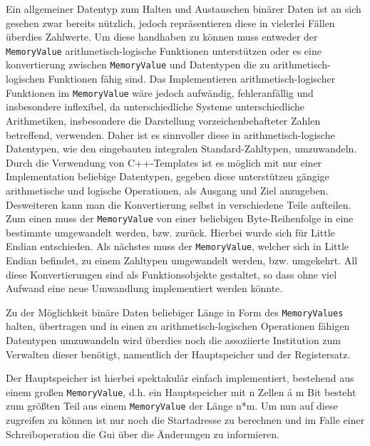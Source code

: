 Ein allgemeiner Datentyp zum Halten und Austauschen binärer Daten ist an sich
gesehen zwar bereits nützlich, jedoch repräsentieren diese in vielerlei Fällen
überdies Zahlwerte. Um diese handhaben zu können muss entweder der
\texttt{MemoryValue} arithmetisch-logische Funktionen unterstützen oder es eine
konvertierung zwischen \texttt{MemoryValue} und Datentypen die zu
arithmetisch-logischen Funktionen fähig sind. Das Implementieren
arithmetisch-logischer Funktionen im \texttt{MemoryValue} wäre jedoch
aufwändig, fehleranfällig und insbesondere inflexibel, da unterschiedliche
Systeme unterschiedliche Arithmetiken, insbesondere die Darstellung
vorzeichenbehafteter Zahlen betreffend, verwenden. Daher ist es sinnvoller
diese in arithmetisch-logische Datentypen, wie den eingebauten integralen
Standard-Zahltypen, umzuwandeln. Durch die Verwendung von C++-Templates ist es
möglich mit nur einer Implementation beliebige Datentypen, gegeben diese
unterstützen gängige arithmetische und logische Operationen, als Ausgang und
Ziel anzugeben. Desweiteren kann man die Konvertierung selbst in verschiedene
Teile aufteilen. Zum einen muss der \texttt{MemoryValue} von einer beliebigen
Byte-Reihenfolge in eine bestimmte umgewandelt werden, bzw. zurück. Hierbei
wurde sich für Little Endian entschieden. Als nächstes muss der
\texttt{MemoryValue}, welcher sich in Little Endian befindet, zu einem
Zahltypen umgewandelt werden, bzw. umgekehrt. All diese Konvertierungen sind
als Funktionsobjekte gestaltet, so dass ohne viel Aufwand eine neue Umwandlung
implementiert werden könnte.

Zu der Möglichkeit binäre Daten beliebiger Länge in Form des
\texttt{MemoryValues} halten, übertragen und in einen zu arithmetisch-logischen
Operationen fähigen Datentypen umzuwandeln wird überdies noch die assoziierte
Institution zum Verwalten dieser benötigt, namentlich der Hauptspeicher und der
Registersatz.

Der Hauptspeicher ist hierbei spektakulär einfach implementiert, bestehend aus
einem großen \texttt{MemoryValue}, d.h. ein Hauptspeicher mit n Zellen á m Bit
besteht zum größten Teil aus einem \texttt{MemoryValue} der Länge n*m. Um nun
auf diese zugreifen zu können ist nur noch die Startadresse zu berechnen und im
Falle einer Schreiboperation die Gui über die Änderungen zu informieren.

